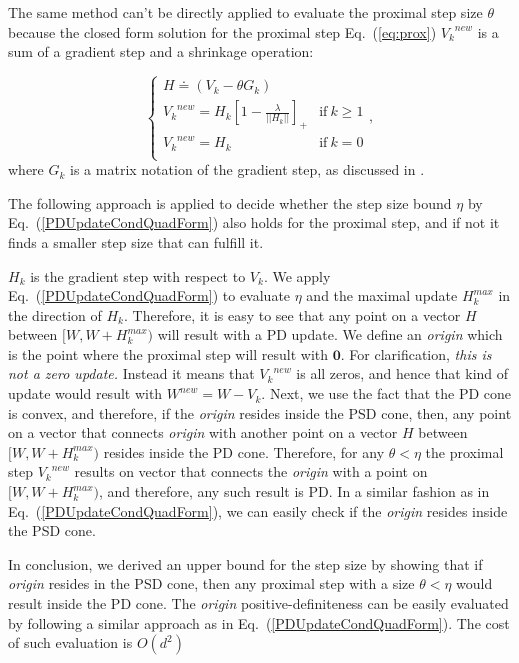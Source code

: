 \documentclass[twoside,11pt]{article}
\newcommand\mat[1]{{#1}}
\renewcommand\vec[1]{\mathbf{#1}}
\newcommand{\W}{\mat{W}}
\newcommand{\newW}{{\mat{W^{new}}}}
\newcommand{\eqdef}{\doteq}
\newcommand{\Hk}{H_k}
\newcommand{\Vk}{\mat{V_k}}
\renewcommand{\eqref}[1]{Eq.~(\ref{#1})}
\begin{document}
The same method can't be directly applied to evaluate the proximal step size $\theta$ because the closed form solution for the proximal step \eqref{eq:prox} $\Vk^{new}$ is a sum of a gradient step and a shrinkage operation:

\begin{equation*}
 \begin{cases}
   H \eqdef (V_k-\theta G_k) \\ 
   \Vk^{new} = \Hk [1 - \frac{\lambda}{||\Hk||}]_+ & \text{if}\  k \geq 1\\
   \Vk^{new} = \Hk & \text{if}\ k = 0 \\ 
 \end{cases},
\end{equation*}
where $G_k$ is a matrix notation of the gradient step, as discussed in \label{learing_dense_comet}. 

The following approach is applied to decide whether the step size bound $\eta$ by \eqref{PDUpdateCondQuadForm} also holds for the proximal step, and if not it finds a smaller step size that can fulfill it.


\newcommand{\Vkorigin}{\emph{origin }}
$\Hk$ is the gradient step with respect to $\Vk$. We apply \eqref{PDUpdateCondQuadForm} to evaluate $\eta$ and the maximal update $\Hk^{max}$ in the direction of $\Hk$. Therefore, it is easy to see that any point on a vector $H$ between $[\W, \W + \Hk^{max})$ will result with a PD update. We define an \Vkorigin which is the point where the proximal step will result with $\vec{0}$. For clarification,  \emph{this is not a zero update.} Instead it means that $\Vk^{new}$ is all zeros, and hence that kind of update would result with $\newW = \W - \Vk$. Next, we use the fact that the PD cone is convex, and therefore, if the \Vkorigin resides inside the PSD cone, then, any point on a vector that connects \Vkorigin with another point on a vector $H$ between $[\W, \W + \Hk^{max})$ resides inside the PD cone. Therefore, for any $\theta < \eta$ the proximal step $\Vk^{new}$ results on vector that connects the \Vkorigin with a point on $[\W, \W + \Hk^{max})$, and therefore, any such result is PD. In a similar fashion as in \eqref{PDUpdateCondQuadForm}, we can easily check if the \Vkorigin resides inside the PSD cone.  

In conclusion, we derived an upper bound for the step size by showing that if \Vkorigin resides in the PSD cone, then any proximal step with a size $\theta < \eta$ would result inside the PD cone. The \Vkorigin positive-definiteness can be easily evaluated by following a similar approach as in \eqref{PDUpdateCondQuadForm}. The cost of such evaluation is $O(d^2)$
\end{document}

